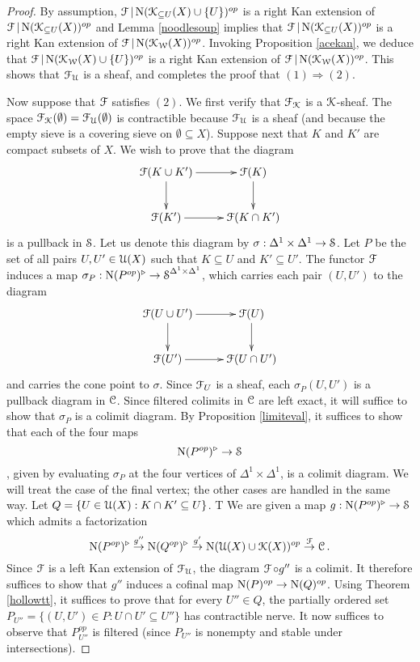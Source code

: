 \begin{proof}
By assumption, $\operatorname{\mathcal{F}} | \operatorname{N} (\operatorname{\mathcal{K}}_{\subseteq U}(X) \cup \{U\})^{op}$ is a right Kan extension of
$\operatorname{\mathcal{F}}| \operatorname{N}(\operatorname{\mathcal{K}}_{\subseteq U}(X))^{op}$ and Lemma \ref{noodlesoup} implies that
$\operatorname{\mathcal{F}}| \operatorname{N}(\operatorname{\mathcal{K}}_{\subseteq U}(X))^{op}$ is a right Kan extension of $\operatorname{\mathcal{F}}| \operatorname{N} (\operatorname{\mathcal{K}}_{\operatorname{\mathcal{W}}}(X))^{op}$. Invoking Proposition \ref{acekan}, we deduce that
$\operatorname{\mathcal{F}}| \operatorname{N} (\operatorname{\mathcal{K}}_{\operatorname{\mathcal{W}}}(X) \cup \{U\})^{op}$ is a right Kan extension of 
$\operatorname{\mathcal{F}}| \operatorname{N} (\operatorname{\mathcal{K}}_{\operatorname{\mathcal{W}}}(X))^{op}$. This shows that $\operatorname{\mathcal{F}}_{\operatorname{\mathcal{U}}}$ is a sheaf, and completes the proof that $(1) \Rightarrow (2)$.

Now suppose that $\operatorname{\mathcal{F}}$ satisfies $(2)$. We first verify that $\operatorname{\mathcal{F}}_{\operatorname{\mathcal{K}}}$ is a $\operatorname{\mathcal{K}}$-sheaf. 
The space $\operatorname{\mathcal{F}}_{\operatorname{\mathcal{K}}}(\emptyset) = \operatorname{\mathcal{F}}_{\operatorname{\mathcal{U}}}(\emptyset)$ is contractible because $\operatorname{\mathcal{F}}_{\operatorname{\mathcal{U}}}$ is a sheaf (and because the empty sieve is a covering sieve on $\emptyset \subseteq X$). Suppose next that $K$ and $K'$ are compact subsets of $X$. We wish to prove that the diagram 
$$ \xymatrix{ \calF( K \cup K' ) \ar[r] \ar[d] & \calF(K) \ar[d] \\
\calF(K') \ar[r] & \calF(K \cap K') }$$
is a pullback in $\operatorname{\mathcal{S}}$. Let us denote this diagram by $\sigma: \Delta^1 \times \Delta^1 \rightarrow \operatorname{\mathcal{S}}$. Let $P$ be the set of all pairs $U,U' \in \operatorname{\mathcal{U}}(X)$ such that $K \subseteq U$ and $K' \subseteq U'$. The functor $\operatorname{\mathcal{F}}$ induces a map $\sigma_{P}: \operatorname{N}(P^{op})^{\triangleright} \rightarrow \operatorname{\mathcal{S}}^{\Delta^1 \times \Delta^1}$, which carries each pair $(U,U')$ to the diagram
$$ \xymatrix{ \calF( U \cup U' ) \ar[r] \ar[d] & \calF(U) \ar[d] \\
\calF(U') \ar[r] & \calF(U \cap U') }$$
and carries the cone point to $\sigma$. Since $\operatorname{\mathcal{F}}_{U}$ is a sheaf, each $\sigma_P(U,U')$ is
a pullback diagram in $\operatorname{\mathcal{C}}$. Since filtered colimits in $\operatorname{\mathcal{C}}$ are left exact, it will suffice to show that $\sigma_P$ is a colimit diagram. By Proposition \ref{limiteval}, it suffices to show that each of the four maps
$$ \operatorname{N}(P^{op})^{\triangleright} \rightarrow \operatorname{\mathcal{S}}$$, given by evaluating $\sigma_P$ at the four vertices of $\Delta^1 \times \Delta^1$, is a colimit diagram. We will treat the case of the final vertex; the other cases are handled in the same way. Let $Q = \{ U \in \operatorname{\mathcal{U}}(X): K \cap K' \subseteq U\}$. T
We are given a map $g: \operatorname{N}(P^{op})^{\triangleright} \rightarrow \operatorname{\mathcal{S}}$ which admits a factorization
$$ \operatorname{N}(P^{op})^{\triangleright} \stackrel{g''}{\rightarrow} \operatorname{N}(Q^{op})^{\triangleright} \stackrel{g'}{\rightarrow}
\operatorname{N} (\operatorname{\mathcal{U}}(X) \cup \operatorname{\mathcal{K}}(X))^{op} \stackrel{\operatorname{\mathcal{F}}}{\rightarrow} \operatorname{\mathcal{C}}.$$
Since $\operatorname{\mathcal{F}}$ is a left Kan extension of $\operatorname{\mathcal{F}}_{\operatorname{\mathcal{U}}}$, the diagram $\operatorname{\mathcal{F}} \circ g''$ is a colimit.
It therefore suffices to show that $g''$ induces a cofinal map $\operatorname{N}(P)^{op} \rightarrow \operatorname{N} (Q)^{op}$. Using Theorem \ref{hollowtt}, it suffices to prove that for every $U'' \in Q$, the
partially ordered set $P_{U''} = \{ (U,U') \in P: U \cap U' \subseteq U'' \}$ has contractible nerve. It now suffices to observe that $P^{op}_{U''}$ is filtered (since $P_{U''}$ is nonempty and stable under intersections). 


\end{proof}
